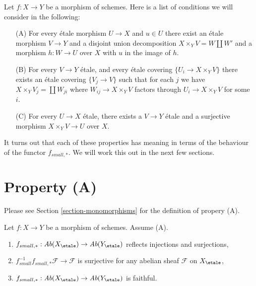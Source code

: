 \noindent
Let $f : X \to Y$ be a morphism of schemes.
Here is a list of conditions we will consider in the following:
\begin{enumerate}
\item[(A)] For every \'etale morphism $U \to X$ and $u \in U$ there exist
an \'etale morphism $V \to Y$ and a disjoint union decomposition
$X \times_Y V = W \amalg W'$ and a morphism $h : W \to U$ over $X$
with $u$ in the image of $h$.
\item[(B)] For every $V \to Y$ \'etale, and every \'etale covering
$\{U_i \to X \times_Y V\}$ there exists an \'etale covering
$\{V_j \to V\}$ such that for each $j$ we have
$X \times_Y V_j = \coprod W_{ji}$ where $W_{ij} \to X \times_Y V$
factors through $U_i \to X \times_Y V$ for some $i$.
\item[(C)] For every $U \to X$ \'etale, there exists a $V \to Y$ \'etale
and a surjective morphism $X \times_Y V \to U$ over $X$.
\end{enumerate}
It turns out that each of these properties has meaning in terms of
the behaviour of the functor $f_{small, *}$. We will work this
out in the next few sections.



\section{Property (A)}
\label{section-A}

\noindent
Please see Section \ref{section-monomorphisms} for the definition of propery
(A).

\begin{lemma}
\label{lemma-property-A-implies}
Let $f : X \to Y$ be a morphism of schemes.
Assume (A).
\begin{enumerate}
\item
$f_{small, *} :
\textit{Ab}(X_\etale)
\to
\textit{Ab}(Y_\etale)$
reflects injections and surjections,
\item $f_{small}^{-1}f_{small, *}\mathcal{F} \to \mathcal{F}$
is surjective for any abelian sheaf $\mathcal{F}$ on $X_\etale$,
\item
$f_{small, *} :
\textit{Ab}(X_\etale)
\to
\textit{Ab}(Y_\etale)$
is faithful.
\end{enumerate}
\end{lemma}

